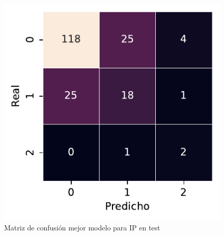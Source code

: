 \begin{figure}[htbp]
    \includegraphics[width=0.75\linewidth]{figures/5_experiments/single-ip-cm.pdf}
    \caption{Matriz de confusión mejor modelo para IP en test}
    \label{fig5:IP_confusion_matrix}
\end{figure}

